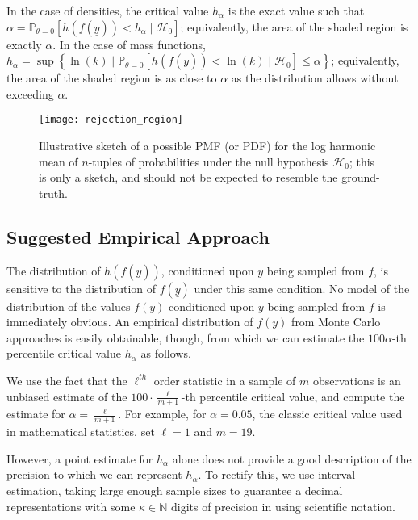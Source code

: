 \documentclass{tran-l}
\theoremstyle{cor}
\theoremstyle{definition}
\theoremstyle{remark}
\theoremstyle{conjecture}
\numberwithin{equation}{section}
\begin{document}
In the case of densities, the critical value $h_{\alpha}$ is the exact value such that $\alpha = \mathbb{P}_{\theta=0}\left[h(f(\underline{y})) < h_\alpha \mid \mathcal{H}_0\right]$; equivalently, the area of the shaded region is exactly $\alpha$.
In the case of mass functions, $h_{\alpha} = \sup\left\{\ln(k) \mid \mathbb{P}_{\theta=0}\left[h(f(\underline{y})) < \ln(k) \mid \mathcal{H}_0\right] \leq \alpha \right\}$; equivalently, the area of the shaded region is as close to $\alpha$ as the distribution allows without exceeding $\alpha$.
\begin{figure}[h]\label{fig:rejection_region}
\centering
\texttt{[image: rejection\_region]}\caption{Illustrative sketch of a possible PMF (or PDF) for the log harmonic mean of $n$-tuples of probabilities under the null hypothesis $\mathcal{H}_0$; this is only a sketch, and should not be expected to resemble the ground-truth.
}
\end{figure}


\subsection{Suggested Empirical Approach}

The distribution of $h(f(\underline{y}))$, conditioned upon $\underline{y}$ being sampled from $f$, is sensitive to the distribution of $f(\underline{y})$ under this same condition.
No model of the distribution of the values $f(y)$ conditioned upon $y$ being sampled from $f$ is immediately obvious.
An empirical distribution of $f(y)$ from Monte Carlo approaches is easily obtainable, though, from which we can estimate the $100\alpha$-th percentile critical value $h_\alpha$ as follows.

We use the fact that the $\ell^{th}$ order statistic in a sample of $m$ observations is an unbiased estimate of the $100 \cdot\frac{\ell}{m+1}$-th percentile critical value, and compute the estimate for $\alpha = \frac{\ell}{m+1}$.
For example, for $\alpha = 0.05$, the classic critical value used in mathematical statistics, set $\ell=1$ and $m=19$.

However, a point estimate for $h_\alpha$ alone does not provide a good description of the precision to which we can represent $h_\alpha$.
To rectify this, we use interval estimation, taking large enough sample sizes to guarantee a decimal representations with some $\kappa \in \mathbb{N}$ digits of precision in using scientific notation.
\end{document}
